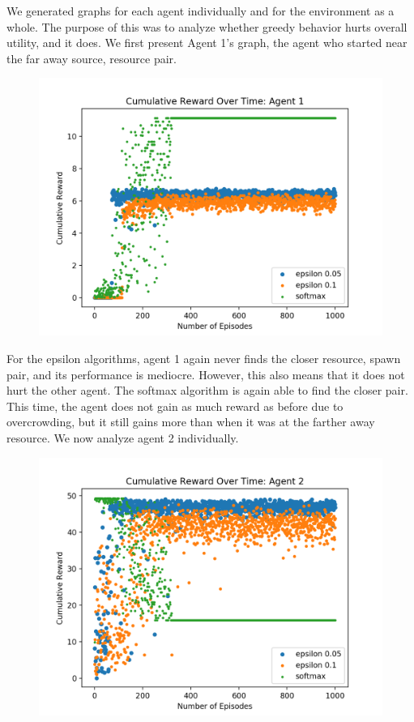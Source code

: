 \documentclass[11pt]{article}
\begin{document}
We generated graphs for each agent individually and for the environment as a whole. The purpose of this was to analyze whether greedy behavior hurts overall utility, and it does. We first present Agent 1's graph, the agent who started near the far away source, resource pair.


\begin{figure}[h]
  \centering
  \includegraphics[width=.7\textwidth]{ai-env2-agent1.png}
\end{figure}

For the epsilon algorithms, agent 1 again never finds the closer resource, spawn pair, and its performance is mediocre. However, this also means that it does not hurt the other agent. The softmax algorithm is again able to find the closer pair. This time, the agent does not gain as much reward as before due to overcrowding, but it still gains more than when it was at the farther away resource. We now analyze agent 2 individually.

\begin{figure}[h]
  \centering
  \includegraphics[width=.7\textwidth]{ai-env2-agent2}
\end{figure}
\end{document}
